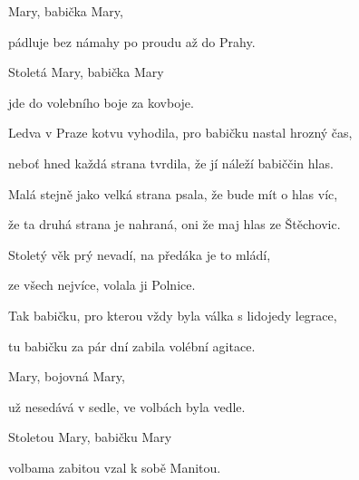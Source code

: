 \zr
Mary, babička Mary, 

pádluje bez námahy po proudu až do Prahy. 

Stoletá Mary, babička Mary 

jde do volebního boje za kovboje. 
\kr

\zs
Ledva v Praze kotvu vyhodila, pro babičku nastal hrozný čas, 

neboť hned každá strana tvrdila, že jí náleží babiččin hlas. 

\bigskip

Malá stejně jako velká strana psala, že bude mít o hlas víc, 

že ta druhá strana je nahraná, oni že maj hlas ze Štěchovic. 

\bigskip

Stoletý věk prý nevadí, na předáka je to mládí, 

ze všech nejvíce, volala ji Polnice. 

\bigskip

Tak babičku, pro kterou vždy byla válka s lidojedy legrace, 

tu babičku za pár dní zabila volébní agitace. 
\ks

\zr
Mary, bojovná Mary, 

už nesedává v sedle, ve volbách byla vedle. 

Stoletou Mary, babičku Mary 

volbama zabitou vzal k sobě Manitou.
\kr
\kp


